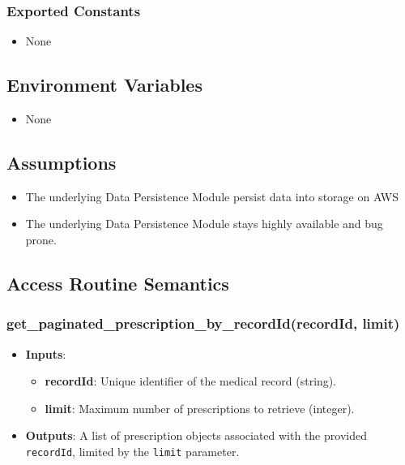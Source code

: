 \documentclass[12pt, titlepage]{article}
\begin{document}
\subsubsection{Exported Constants}
\begin{itemize}
\item None
\end{itemize}

\subsection{Environment Variables}
\begin{itemize}
  \item None
\end{itemize}

\subsection{Assumptions}
\begin{itemize}
    \item The underlying Data Persistence Module persist data into storage on AWS
    \item The underlying Data Persistence Module stays highly available and bug prone.
\end{itemize}


\subsection{Access Routine Semantics}
\subsubsection{get\_paginated\_prescription\_by\_recordId(recordId, limit)}
\begin{itemize}
    \item \textbf{Inputs}:
        \begin{itemize}
            \item \textbf{recordId}: Unique identifier of the medical record (string).
            \item \textbf{limit}: Maximum number of prescriptions to retrieve (integer).
        \end{itemize}
    \item \textbf{Outputs}: A list of prescription objects associated with the provided \texttt{recordId}, limited by the \texttt{limit} parameter.
\end{itemize}
\end{document}
